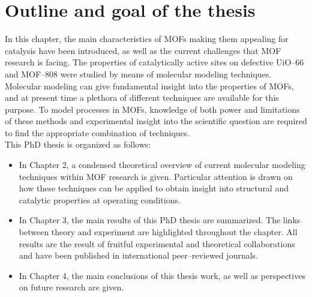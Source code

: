 \section{Outline and goal of the thesis}
In this chapter, the main characteristics of MOFs making them appealing for catalysis have been introduced, as well as the current challenges that MOF research is facing. The properties of catalytically active sites on defective UiO--66 and MOF--808 were studied by means of molecular modeling techniques. Molecular modeling can give fundamental insight into the properties of MOFs, and at present time a plethora of different techniques are available for this purpose. To model processes in MOFs, knowledge of both power and limitations of these methods and experimental insight into the scientific question are required to find the appropriate combination of techniques.\\
This PhD thesis is organized as follows:
\begin{itemize}
\item In Chapter 2, a condensed theoretical overview of current molecular modeling techniques within MOF research is given. Particular attention is drawn on how these techniques can be applied to obtain insight into structural and catalytic properties at operating conditions.
\item In Chapter 3, the main results of this PhD thesis are summarized. The links between theory and experiment are highlighted throughout the chapter. All results are the result of fruitful experimental and theoretical collaborations and have been published in international peer--reviewed journals. 
\item In Chapter 4, the main conclusions of this thesis work, as well as perspectives on future research are given.
\end{itemize}

\clearpage{\pagestyle{empty}\cleardoublepage}
